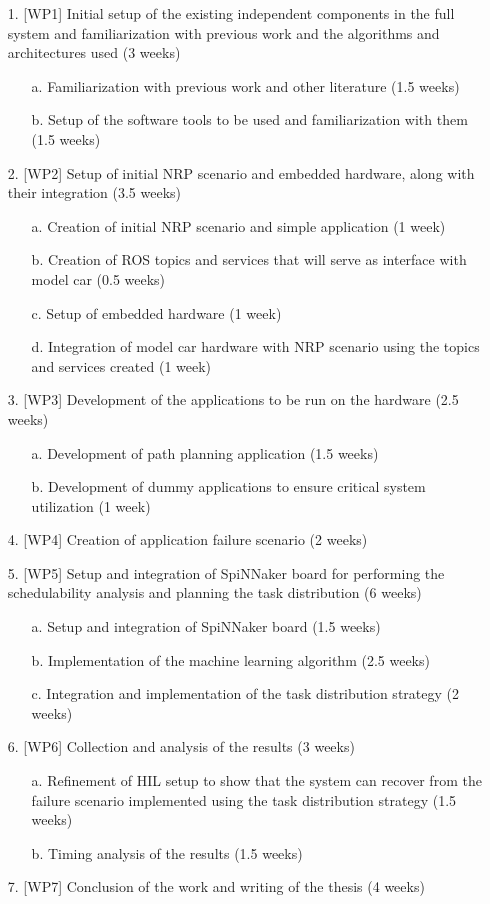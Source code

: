 \begin{enumerate}
\item [1.]	[WP1] Initial setup of the existing independent components in the full system and familiarization with previous work and the algorithms and architectures used (3 weeks)
	\begin{enumerate}
	\item [a.]	Familiarization with previous work and other literature (1.5 weeks)
	\item [b.]	Setup of the software tools to be used and familiarization with them (1.5 weeks)
	\end{enumerate}
\item [2.]	[WP2] Setup of initial NRP scenario and embedded hardware, along with their integration (3.5 weeks)
	\begin{enumerate}
	\item [a.]	Creation of initial NRP scenario and simple application (1 week)
	\item [b.]	Creation of ROS topics and services that will serve as interface with model car (0.5 weeks)
	\item [c.]	Setup of embedded hardware (1 week)
	\item [d.]	Integration of model car hardware with NRP scenario using the topics and services created (1 week)
	\end{enumerate}
\item [3.]	[WP3] Development of the applications to be run on the hardware (2.5 weeks)
	\begin{enumerate}
	\item [a.]	Development of path planning application (1.5 weeks)
	\item [b.]	Development of dummy applications to ensure critical system utilization (1 week)
	\end{enumerate}
\item [4.]	[WP4] Creation of application failure scenario (2 weeks)
\item [5.]	[WP5] Setup and integration of SpiNNaker board for performing the schedulability analysis and planning the task distribution (6 weeks)
	\begin{enumerate}
	\item [a.]	Setup and integration of SpiNNaker board (1.5 weeks)
	\item [b.]	Implementation of the machine learning algorithm (2.5 weeks)
	\item [c.]	Integration and implementation of the task distribution strategy (2 weeks)
	\end{enumerate}
\item [6.]	[WP6] Collection and analysis of the results (3 weeks)
	\begin{enumerate}
	\item [a.]	Refinement of HIL setup to show that the system can recover from the failure scenario implemented using the task distribution strategy (1.5 weeks)
	\item [b.]	Timing analysis of the results (1.5 weeks)
	\end{enumerate}
\item [7.]	[WP7] Conclusion of the work and writing of the thesis (4 weeks)
\end{enumerate}

